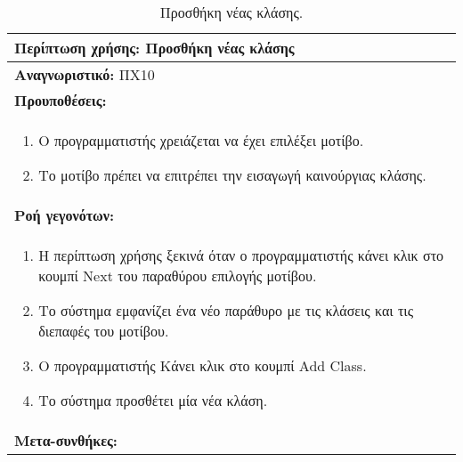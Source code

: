 \begin{table}[H]
	\hspace*{-0.2cm}
    \centering
    \scriptsize
	\begin{tabular}{|p{10cm}|}
	\hline
		\textbf{Περίπτωση χρήσης:} Προσθήκη νέας κλάσης  \\
	\hline
		\textbf{Αναγνωριστικό:} ΠΧ10 \\
	\hline	
		\textbf{Προυποθέσεις:} \\
		\begin{enumerate}
		 \item Ο προγραμματιστής χρειάζεται να έχει επιλέξει μοτίβο.
		 \item Το μοτίβο πρέπει να επιτρέπει την εισαγωγή καινούργιας κλάσης.
		\end{enumerate} \\
	\hline
		\textbf{Ροή γεγονότων:} \\
		\begin{enumerate}
			\item Η περίπτωση χρήσης ξεκινά όταν ο προγραμματιστής κάνει κλικ στο κουμπί Next του παραθύρου επιλογής μοτίβου.
			\item Το σύστημα εμφανίζει ένα νέο παράθυρο με τις κλάσεις και τις διεπαφές του μοτίβου.
			\item Ο προγραμματιστής Κάνει κλικ στο κουμπί Add Class.
			\item Το σύστημα προσθέτει μία νέα κλάση.
			
		\end{enumerate} \\
	\hline
		\textbf{Μετα-συνθήκες:} \\
	\hline
    \end{tabular}
    \caption{Προσθήκη νέας κλάσης.}
    \label{tab:addNewClass}
\end{table}
